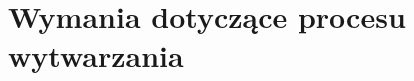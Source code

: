 



\section{Wymania dotyczące procesu wytwarzania}
\label{sec:wymania-dotyczace-procesu-wytwarzania}

